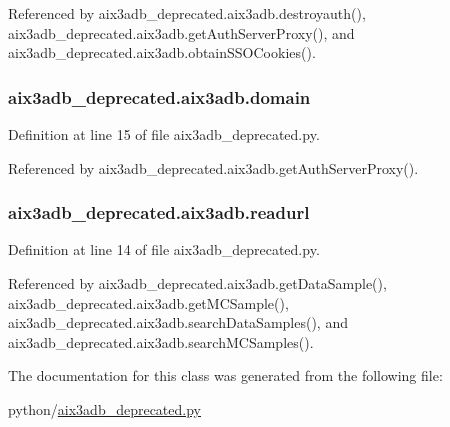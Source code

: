 Referenced by aix3adb\-\_\-deprecated.\-aix3adb.\-destroyauth(), aix3adb\-\_\-deprecated.\-aix3adb.\-get\-Auth\-Server\-Proxy(), and aix3adb\-\_\-deprecated.\-aix3adb.\-obtain\-S\-S\-O\-Cookies().

\subsubsection[{domain}]{\setlength{\rightskip}{0pt plus 5cm}aix3adb\-\_\-deprecated.\-aix3adb.\-domain\hspace{0.3cm}{\ttfamily [inherited]}}\label{classaix3adb__deprecated_1_1aix3adb_a71fa095d2699a77af3fc32196db3c265}


Definition at line 15 of file aix3adb\-\_\-deprecated.\-py.



Referenced by aix3adb\-\_\-deprecated.\-aix3adb.\-get\-Auth\-Server\-Proxy().

\subsubsection[{readurl}]{\setlength{\rightskip}{0pt plus 5cm}aix3adb\-\_\-deprecated.\-aix3adb.\-readurl\hspace{0.3cm}{\ttfamily [inherited]}}\label{classaix3adb__deprecated_1_1aix3adb_a7d22b98dfb97d1a16a75189765efea2c}


Definition at line 14 of file aix3adb\-\_\-deprecated.\-py.



Referenced by aix3adb\-\_\-deprecated.\-aix3adb.\-get\-Data\-Sample(), aix3adb\-\_\-deprecated.\-aix3adb.\-get\-M\-C\-Sample(), aix3adb\-\_\-deprecated.\-aix3adb.\-search\-Data\-Samples(), and aix3adb\-\_\-deprecated.\-aix3adb.\-search\-M\-C\-Samples().



The documentation for this class was generated from the following file\-:\begin{DoxyCompactItemize}
\item 
python/\hyperlink{aix3adb__deprecated_8py}{aix3adb\-\_\-deprecated.\-py}\end{DoxyCompactItemize}
